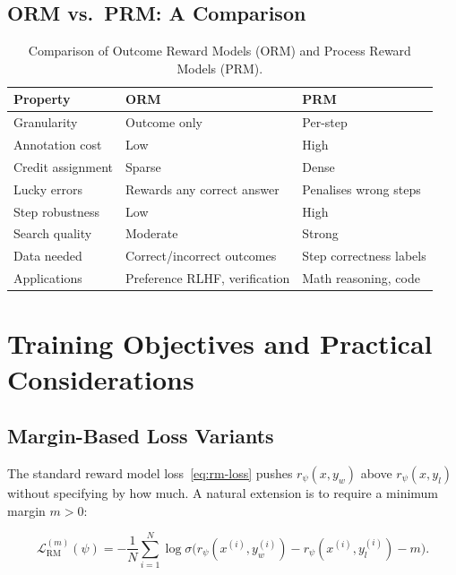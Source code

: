\subsection{ORM vs.\ PRM: A Comparison}

\begin{table}[ht]
\centering
\caption{Comparison of Outcome Reward Models (ORM) and Process Reward Models (PRM).}
\label{tab:orm-prm}
\small
\begin{tabular}{@{}lp{4.5cm}p{4.5cm}@{}}
\toprule
\textbf{Property} & \textbf{ORM} & \textbf{PRM} \\
\midrule
Granularity & Outcome only & Per-step \\
Annotation cost & Low & High \\
Credit assignment & Sparse & Dense \\
Lucky errors & Rewards any correct answer & Penalises wrong steps \\
Step robustness & Low & High \\
Search quality & Moderate & Strong \\
Data needed & Correct/incorrect outcomes & Step correctness labels \\
Applications & Preference RLHF, verification & Math reasoning, code \\
\bottomrule
\end{tabular}
\end{table}

\section{Training Objectives and Practical Considerations}
\label{sec:rm-objectives}

\subsection{Margin-Based Loss Variants}

The standard reward model loss~\eqref{eq:rm-loss} pushes $r_\psi(x, y_w)$ above $r_\psi(x, y_l)$ without specifying by how much. A natural extension is to require a minimum margin $m > 0$:

\begin{equation}
\label{eq:rm-margin-loss}
\mathcal{L}_{\mathrm{RM}}^{(m)}(\psi)
= -\frac{1}{N}\sum_{i=1}^{N}
\log \sigma\!\bigl(r_\psi(x^{(i)}, y_w^{(i)}) - r_\psi(x^{(i)}, y_l^{(i)}) - m\bigr).
\end{equation}


